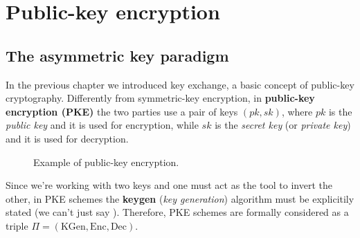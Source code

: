 \documentclass[a4paper, 12pt]{report}
\begin{document}
    \chapter{Public-key encryption}

    \section{The asymmetric key paradigm}

    In the previous chapter we introduced key exchange, a basic concept of public-key cryptography. Differently from symmetric-key encryption, in \textbf{public-key encryption (PKE)} the two parties use a pair of keys $(pk, sk)$, where $pk$ is the \textit{public key} and it is used for encryption, while $sk$ is the \textit{secret key} (or \textit{private key}) and it is used for decryption.  

    \begin{figure}[H]
        \centering


        \caption{Example of public-key encryption.}
    \end{figure}

    Since we're working with two keys and one must act as the tool to invert the other, in PKE schemes the \textbf{keygen} (\textit{key generation}) algorithm must be explicitily stated (we can't just say ). Therefore, PKE schemes are formally considered as a triple $\Pi = (\mathrm{KGen}, \mathrm{Enc}, \mathrm{Dec})$. 
\end{document}
